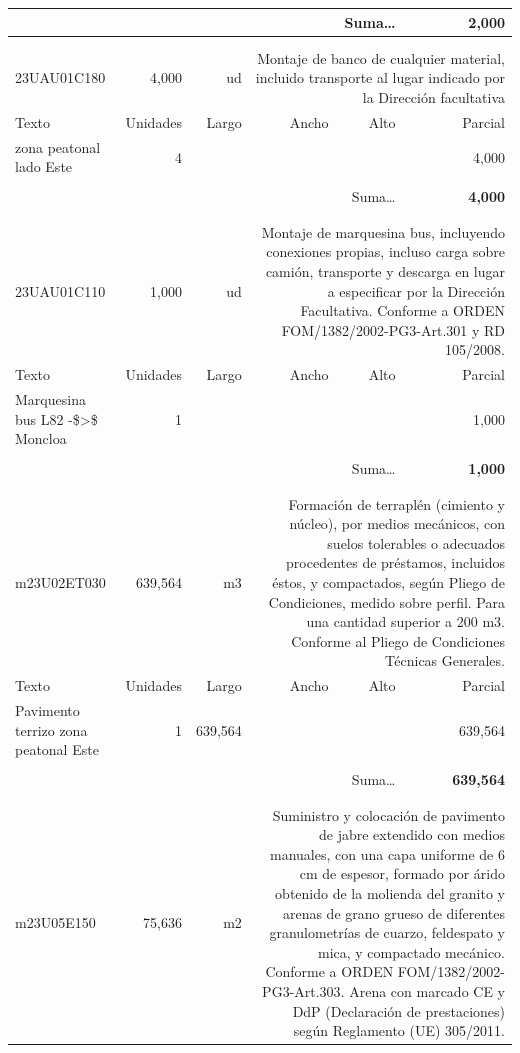 \documentclass{book}%
\begin{document}
\begin{longtable}{lrrrrr}
\multicolumn{5}{r}{Suma\ldots}&\textbf{     2,000}\\%
\hline%
&&&&&\\%
&&&&&\\%
23UAU01C180&     4,000& ud&\multicolumn{3}{p{6cm}}{\scriptsize Montaje de banco de cualquier material, incluido transporte al lugar indicado por la Dirección facultativa\normalsize}\\%
Texto&Unidades&Largo&Ancho&Alto&Parcial\\%
\hline%
\multicolumn{1}{p{3.5cm}}{ zona peatonal lado Este}&4&&&&     4,000\\%
&&&&&\\%
\multicolumn{5}{r}{Suma\ldots}&\textbf{     4,000}\\%
\hline%
&&&&&\\%
&&&&&\\%
23UAU01C110&     1,000& ud&\multicolumn{3}{p{6cm}}{\scriptsize Montaje de marquesina bus, incluyendo conexiones propias, incluso carga sobre camión, transporte y descarga en lugar a especificar por la Dirección Facultativa. Conforme a ORDEN FOM/1382/2002-PG3-Art.301 y RD 105/2008.\normalsize}\\%
Texto&Unidades&Largo&Ancho&Alto&Parcial\\%
\hline%
\multicolumn{1}{p{3.5cm}}{Marquesina bus L82 {-}\$>\$ Moncloa}&1&&&&     1,000\\%
&&&&&\\%
\multicolumn{5}{r}{Suma\ldots}&\textbf{     1,000}\\%
\hline%
&&&&&\\%
&&&&&\\%
m23U02ET030&   639,564& m3&\multicolumn{3}{p{6cm}}{\scriptsize Formación de terraplén (cimiento y núcleo), por medios mecánicos, con suelos tolerables o adecuados procedentes de préstamos, incluidos éstos, y compactados, según Pliego de Condiciones, medido sobre perfil. Para una cantidad superior a 200 m3. Conforme al Pliego de Condiciones Técnicas Generales.\normalsize}\\%
Texto&Unidades&Largo&Ancho&Alto&Parcial\\%
\hline%
\multicolumn{1}{p{3.5cm}}{Pavimento terrizo zona peatonal Este}&1&639,564&&&   639,564\\%
&&&&&\\%
\multicolumn{5}{r}{Suma\ldots}&\textbf{   639,564}\\%
\hline%
&&&&&\\%
&&&&&\\%
m23U05E150&    75,636& m2&\multicolumn{3}{p{6cm}}{\scriptsize Suministro y colocación de pavimento de jabre extendido con medios manuales, con una capa uniforme de 6 cm de espesor, formado por árido obtenido de la molienda del granito y arenas de grano grueso de diferentes granulometrías de cuarzo, feldespato y mica, y compactado mecánico. Conforme a ORDEN FOM/1382/2002-PG3-Art.303. Arena con marcado CE y DdP (Declaración de prestaciones) según Reglamento (UE) 305/2011.\normalsize}\\%

\end{longtable}
\end{document}
